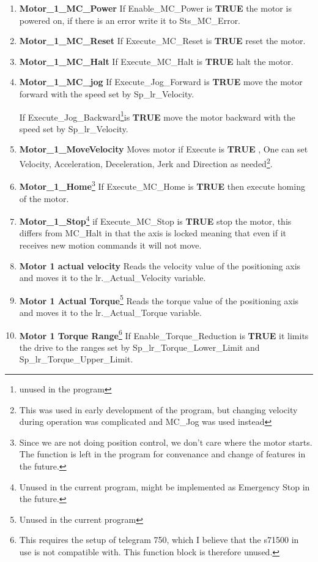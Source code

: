 \documentclass{ol-softwaremanual}
\newcommand{\true}{\textbf{TRUE} }
\begin{document}
\begin{enumerate}[label= \textbf{Network \arabic*:}]
    \item \textbf{ Motor\_1\_MC\_Power} If Enable\_MC\_Power is \true the motor is powered on, if there is an error write it to Sts\_MC\_Error.
    \item \textbf{ Motor\_1\_MC\_Reset} If Execute\_MC\_Reset is \true reset the motor.
    \item \textbf{ Motor\_1\_MC\_Halt} If Execute\_MC\_Halt is \true halt the motor.
    \item \textbf{ Motor\_1\_MC\_jog} If Execute\_Jog\_Forward is \true move the motor forward with the speed set by Sp\_lr\_Velocity. 
    
    If Execute\_Jog\_Backward\footnote{unused in the program }is \true move the motor backward with the speed set by Sp\_lr\_Velocity.
    \item \textbf{ Motor\_1\_MoveVelocity} Moves motor if Execute is \true, One can set Velocity, Acceleration, Deceleration, Jerk and Direction as needed\footnote{This was used in early development of the program, but changing velocity during operation was complicated and MC\_Jog was used instead}.  
    \item \textbf{Motor\_1\_Home}\footnote{Since we are not doing position control, we don't care where the motor starts. The function is left in the program for convenance and change of features in the future.} If Execute\_MC\_Home is \true then execute homing of the motor.
    \item \textbf{Motor\_1\_Stop}\footnote{Unused in the current program, might be implemented as Emergency Stop in the future.} if Execute\_MC\_Stop is \true stop the motor, this differs from MC\_Halt in that the axis is locked meaning that even if it receives new motion commands it will not move.
    \item \textbf{Motor 1 actual velocity} Reads the velocity value of the positioning axis and moves it to the lr.\_Actual\_Velocity variable.
    \item \textbf{Motor 1 Actual Torque}\footnote{Unused in the current program} Reads the torque value of the positioning axis and moves it to the lr.\_Actual\_Torque variable.
    \item \textbf{Motor 1 Torque Range}\footnote{This requires the setup of telegram 750, which I believe that the \Gls{s71500} in use is not compatible with. This function block is therefore unused.} If Enable\_Torque\_Reduction is \true it limits the drive to the ranges set by Sp\_lr\_Torque\_Lower\_Limit and Sp\_lr\_Torque\_Upper\_Limit. 
\end{enumerate}
\clearpage
\appendix
\end{document}
